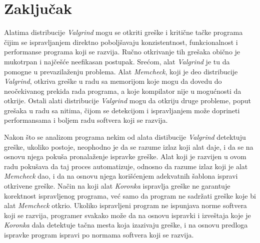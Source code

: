 \documentclass[12pt,oneside]{memoir}
\theoremstyle{plain}
\theoremstyle{definition}
\begin{document}

\chapter{Zaključak}
Alatima distribucije \textit{Valgrind} mogu se otkriti greške i kritične tačke programa čijim se ispravljanjem direktno poboljšavaju konzistentnost, funkcionalnost i performanse programa koji se razvija. Ručno otkrivanje tih grešaka obično je mukotrpan i najčešće neefikasan postupak. Srećom, alat \textit{Valgrind} je tu da pomogne u prevazilaženju problema. Alat \textit{Memcheck}, koji je deo distribucije \textit{Valgrind}, otkriva greške u radu sa memorijom koje mogu da dovedu do neočekivanog prekida rada programa, a koje kompilator nije u mogućnosti da otkrije. Ostali alati distribucije \textit{Valgrind} mogu da otkriju druge probleme, poput grešaka u radu sa nitima, čijom se detekcijom i ispravljanjem može doprineti performansama i boljem radu softvera koji se razvija. 

Nakon što se analizom programa nekim od alata distibucije \textit{Valgrind} detektuju greške, ukoliko postoje, neophodno je da se razume izlaz koji alat daje, i da se na osnovu njega pokuša pronalaženje ispravke greške. Alat koji je razvijen u ovom radu pokušava da taj proces automatizuje, odnosno da razume izlaz koji je alat \textit{Memcheck} dao, i da na osnovu njega korišćenjem adekvatnih šablona ispravi otkrivene greške. Način na koji alat \textit{Koronka} ispravlja greške ne garantuje korektnost ispravljenog programa, već samo da program ne sadržati greške koje bi alat \textit{Memcheck} otkrio. Ukoliko ispravljeni program ne ispunjava norme softvera koji se razvija, programer svakako može da na osnovu ispravki i izveštaja koje je \textit{Koronka} dala detektuje tačna mesta koja izazivaju greške, i na osnovu predloga ispravke program ispravi po normama softvera koji se razvija.
\end{document}
